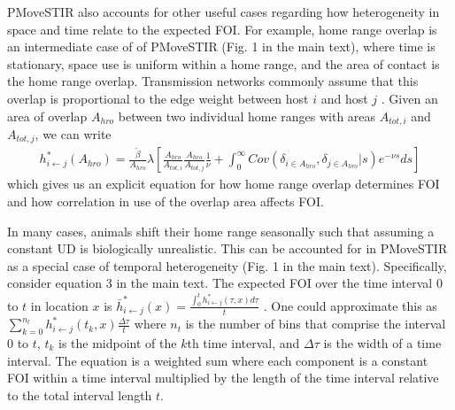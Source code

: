 \documentclass[letterpaper]{article}
\begin{document}
PMoveSTIR also accounts for other useful cases regarding how heterogeneity in space and time relate to the expected FOI. For example, home range overlap is an intermediate case of of PMoveSTIR (Fig. 1 in the main text), where time is stationary, space use is uniform within a home range, and the area of contact is the home range overlap.  
Transmission networks commonly assume that this overlap is proportional to the edge weight between host $i$ and host $j$ \citep[e.g.][]{Springer2017a}. 
Given an area of overlap $A_{hro}$ between two individual home ranges with areas $A_{tot, i}$ and $A_{tot, j}$, we can write
\begin{equation}
    \begin{aligned}
    h^*_{i \leftarrow j}(A_{hro}) = \frac{\tilde{\beta}}{A_{hro}} \lambda \left[\frac{A_{hro}}{A_{tot, i}} \frac{A_{hro}}{A_{tot, j}}  \frac{1}{\nu} + \int_{0}^{\infty} Cov(\delta_{i \in A_{hro}}, \delta_{j \in A_{hro}} | s) e^{-\nu s} ds\right]
    \end{aligned}
    \label{eq:home_range}
\end{equation}
which gives us an explicit equation for how home range overlap determines FOI and how correlation in use of the overlap area affects FOI. 

In many cases, animals shift their home range seasonally \citep{Viana2018,Richard2014} such that assuming a constant UD is biologically unrealistic. This can be accounted for in PMoveSTIR as a special case of temporal heterogeneity (Fig. 1 in the main text).  Specifically, consider equation 3 in the main text. The expected FOI over the time interval 0 to $t$ in location $x$ is $\bar{h}^*_{i \leftarrow j}(x) = \frac{\int_0^t h^*_{i \leftarrow j}(\tau, x) d\tau}{t}$ \citep{Wilber2022}.  One could approximate this as $\sum_{k = 0}^{n_t} h^*_{i \leftarrow j}(t_k, x) \frac{\Delta \tau}{t}$ where $n_t$ is the number of bins that comprise the interval 0 to $t$, $t_k$ is the midpoint of the $k$th time interval, and $\Delta \tau$ is the width of a time interval.  The equation is a weighted sum where each component is a constant FOI within a time interval multiplied by the length of the time interval relative to the total interval length $t$.  
\end{document}
